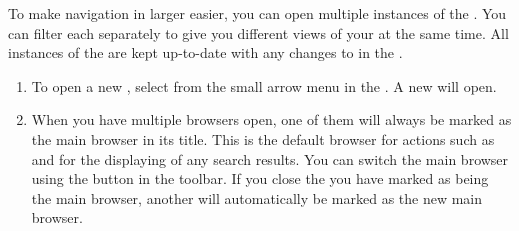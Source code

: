 
To make navigation in larger \gdprojects{} easier, you can open multiple instances of the \gdtestcasebrowser{}. You can filter each \gdtestcasebrowser{} separately to give you different views of your \gdcases{} at the same time. All instances of the \gdtestcasebrowser{} are kept up-to-date with any changes to \gdcases{} in the \gdproject{}.

\begin{enumerate}
\item To open a new \gdtestcasebrowser{}, select  from the small arrow menu in the \gdtestcasebrowser{}. A new \gdtestcasebrowser{} will open.
\item When you have multiple browsers open, one of them will always be marked as the main browser in its title. This is the default browser for actions such as  and for the displaying of any search results. You can switch the main browser using the button in the toolbar. If you close the \gdtestcasebrowser{} you have marked as being the main browser, another \gdtestcasebrowser{} will automatically be marked as the new main browser.
\end{enumerate}
